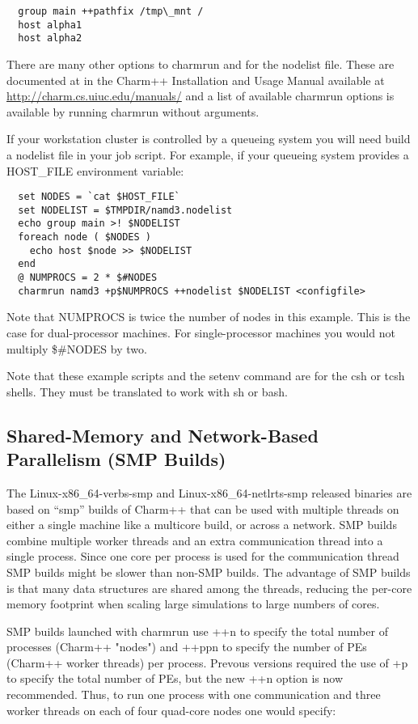 \begin{verbatim}
  group main ++pathfix /tmp\_mnt /
  host alpha1
  host alpha2
\end{verbatim}

There are many other options to charmrun and for the nodelist file.
These are documented at in the Charm++ Installation and Usage Manual
available at \url{http://charm.cs.uiuc.edu/manuals/} and a list of available
charmrun options is available by running charmrun without arguments.

If your workstation cluster is controlled by a queueing system you
will need build a nodelist file in your job script.  For example, if
your queueing system provides a HOST\_FILE environment variable:

\begin{verbatim}
  set NODES = `cat $HOST_FILE`
  set NODELIST = $TMPDIR/namd3.nodelist
  echo group main >! $NODELIST
  foreach node ( $NODES )
    echo host $node >> $NODELIST
  end
  @ NUMPROCS = 2 * $#NODES
  charmrun namd3 +p$NUMPROCS ++nodelist $NODELIST <configfile>
\end{verbatim}

Note that NUMPROCS is twice the number of nodes in this example.
This is the case for dual-processor machines.  For single-processor
machines you would not multiply \$\#NODES by two.

Note that these example scripts and the setenv command are for the csh
or tcsh shells.  They must be translated to work with sh or bash.

\subsection{Shared-Memory and Network-Based Parallelism (SMP Builds)}

The Linux-x86\_64-verbs-smp and Linux-x86\_64-netlrts-smp released binaries are
based on ``smp'' builds of Charm++ that can be used with multiple threads
on either a single machine like a multicore build, or across a network.
SMP builds combine multiple worker threads and an extra communication
thread into a single process.  Since one core per process is used for
the communication thread SMP builds might be slower than non-SMP
builds.  The advantage of SMP builds is that many data structures are
shared among the threads, reducing the per-core memory footprint when
scaling large simulations to large numbers of cores.

SMP builds launched with charmrun use ++n to specify the total number of
processes (Charm++ "nodes") and ++ppn to specify the number of PEs (Charm++
worker threads) per process.  Prevous versions required the use of +p to
specify the total number of PEs, but the new ++n option is now recommended.
Thus, to run one process with one communication and three worker threads
on each of four quad-core nodes one would specify:

